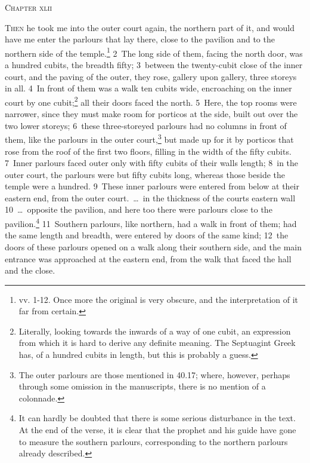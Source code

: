 \documentclass[10pt]{book} %
\begin{document}
\begin{large}\begin{center}\textsc{Chapter xlii}\end{center}\end{large}
\lettrine[lines=2]{T}{hen} he took me into the outer court again, the northern part of it, and would have me enter the parlours that lay there, close to the pavilion and to the northern side of the temple.\footnote[1]{vv. 1-12. Once more the original is very obscure, and the interpretation of it far from certain.} \textcolor{benred8}{2}~The long side of them, facing the north door, was a hundred cubits, the breadth fifty; \textcolor{benred8}{3}~between the twenty-cubit close of the inner court, and the paving of the outer, they rose, gallery upon gallery, three storeys in all. \textcolor{benred8}{4}~In front of them was a walk ten cubits wide, encroaching on the inner court by one cubit;\footnote[2]{Literally, \textasciigrave looking towards the inwards of a way of one cubit\textquotesingle , an expression from which it is hard to derive any definite meaning. The Septuagint Greek has, \textasciigrave of a hundred cubits in length\textquotesingle , but this is probably a guess.} all their doors faced the north. \textcolor{benred8}{5}~Here, the top rooms were narrower, since they must make room for porticos at the side, built out over the two lower storeys; \textcolor{benred8}{6}~these three-storeyed parlours had no columns in front of them, like the parlours in the outer court,\footnote[3]{The outer parlours are those mentioned in 40.17; where, however, perhaps through some omission in the manuscripts, there is no mention of a colonnade.} but made up for it by porticos that rose from the roof of the first two floors, filling in the width of the fifty cubits. \textcolor{benred8}{7}~Inner parlours faced outer only with fifty cubits of their wall\textquotesingle s length; \textcolor{benred8}{8}~in the outer court, the parlours were but fifty cubits long, whereas those beside the temple were a hundred. \textcolor{benred8}{9}~These inner parlours were entered from below at their eastern end, from the outer court.~\ldots\  in the thickness of the court\textquotesingle s eastern wall \textcolor{benred8}{10}~\ldots\  opposite the pavilion, and here too there were parlours close to the pavilion.\footnote[4]{It can hardly be doubted that there is some serious disturbance in the text. At the end of the verse, it is clear that the prophet and his guide have gone to measure the southern parlours, corresponding to the northern parlours already described.} \textcolor{benred8}{11}~Southern parlours, like northern, had a walk in front of them; had the same length and breadth, were entered by doors of the same kind; \textcolor{benred8}{12}~the doors of these parlours opened on a walk along their southern side, and the main entrance was approached at the eastern end, from the walk that faced the hall and the close.
\end{document}
